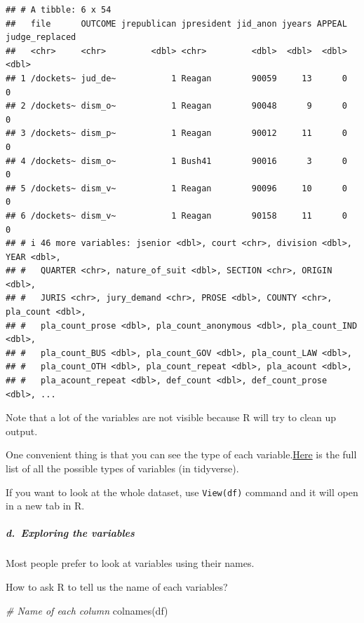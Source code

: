 \documentclass[
]{article}
\newenvironment{Shaded}{\begin{snugshade}}{\end{snugshade}}
\newcommand{\CommentTok}[1]{\textcolor[rgb]{0.56,0.35,0.01}{\textit{#1}}}
\newcommand{\FunctionTok}[1]{\textcolor[rgb]{0.00,0.00,0.00}{#1}}
\newcommand{\NormalTok}[1]{#1}
\begin{document}
\begin{verbatim}
## # A tibble: 6 x 54
##   file      OUTCOME jrepublican jpresident jid_anon jyears APPEAL judge_replaced
##   <chr>     <chr>         <dbl> <chr>         <dbl>  <dbl>  <dbl>          <dbl>
## 1 /dockets~ jud_de~           1 Reagan        90059     13      0              0
## 2 /dockets~ dism_o~           1 Reagan        90048      9      0              0
## 3 /dockets~ dism_p~           1 Reagan        90012     11      0              0
## 4 /dockets~ dism_o~           1 Bush41        90016      3      0              0
## 5 /dockets~ dism_v~           1 Reagan        90096     10      0              0
## 6 /dockets~ dism_v~           1 Reagan        90158     11      0              0
## # i 46 more variables: jsenior <dbl>, court <chr>, division <dbl>, YEAR <dbl>,
## #   QUARTER <chr>, nature_of_suit <dbl>, SECTION <chr>, ORIGIN <dbl>,
## #   JURIS <chr>, jury_demand <chr>, PROSE <dbl>, COUNTY <chr>, pla_count <dbl>,
## #   pla_count_prose <dbl>, pla_count_anonymous <dbl>, pla_count_IND <dbl>,
## #   pla_count_BUS <dbl>, pla_count_GOV <dbl>, pla_count_LAW <dbl>,
## #   pla_count_OTH <dbl>, pla_count_repeat <dbl>, pla_acount <dbl>,
## #   pla_acount_repeat <dbl>, def_count <dbl>, def_count_prose <dbl>, ...
\end{verbatim}

Note that a lot of the variables are not visible because R will try to
clean up output.

One convenient thing is that you can see the type of each
variable.\href{https://tibble.tidyverse.org/articles/types.html}{Here}
is the full list of all the possible types of variables (in tidyverse).

If you want to look at the whole dataset, use \texttt{View(df)} command
and it will open in a new tab in R.

\hypertarget{d.-exploring-the-variables}{%
\subparagraph{d.~Exploring the
variables}\label{d.-exploring-the-variables}}

Most people prefer to look at variables using their names.

How to ask R to tell us the name of each variables?

\begin{Shaded}
\begin{Highlighting}[]
\CommentTok{\# Name of each column}
\FunctionTok{colnames}\NormalTok{(df)}
\end{Highlighting}
\end{Shaded}
\end{document}
